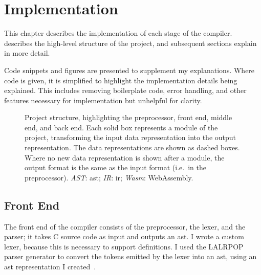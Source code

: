 \documentclass[00-main.tex]{subfiles}
\begin{document}
\chapter{Implementation}
\glsresetall %

This chapter describes the implementation of each stage of the compiler.
 describes the high-level structure of the project, and subsequent sections explain in more detail.

Code snippets and figures are presented to supplement my explanations.
Where code is given, it is simplified to highlight the implementation details being explained.
This includes removing boilerplate code, error handling, and other features necessary for implementation but unhelpful for clarity.

\begin{figure}[!t]
  \centering
  \caption{Project structure, highlighting the preprocessor, front end, middle end, and back end. Each solid box represents a module of the project, transforming the input data representation into the output representation. The data representations are shown as dashed boxes. Where no new data representation is shown after a module, the output format is the same as the input format (i.e.~in the preprocessor). \emph{AST}: \acrlong{ast}; \emph{IR}: \acrlong{ir}; \emph{Wasm}: WebAssembly.}%
  \label{fig:project flowchart}
\end{figure}



\section{Front End}\label{sec:impl:front end}


The front end of the compiler consists of the preprocessor, the lexer, and the parser; it takes C source code as input and outputs an \gls{ast}.
I wrote a custom lexer, because this is necessary to support  definitions.
I used the LALRPOP parser generator to convert the tokens emitted by the lexer into an \gls{ast}, using an \gls{ast} representation I created~.
\end{document}
